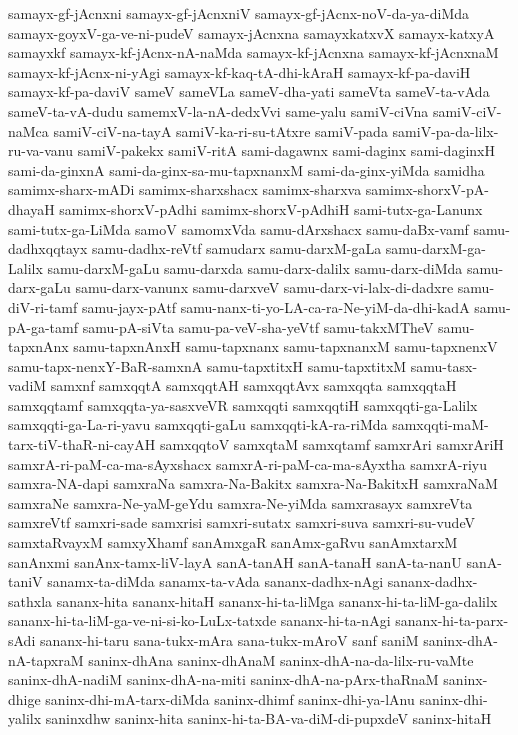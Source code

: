{samayx-gf-jAcnxni
samayx-gf-jAcnxniV
samayx-gf-jAcnx-noV-da-ya-diMda
samayx-goyxV-ga-ve-ni-pudeV
samayx-jAcnxna
samayxkatxvX
samayx-katxyA
samayxkf
samayx-kf-jAcnx-nA-naMda
samayx-kf-jAcnxna
samayx-kf-jAcnxnaM
samayx-kf-jAcnx-ni-yAgi
samayx-kf-kaq-tA-dhi-kAraH
samayx-kf-pa-daviH
samayx-kf-pa-daviV
sameV
sameVLa
sameV-dha-yati
sameVta
sameV-ta-vAda
sameV-ta-vA-dudu
samemxV-la-nA-dedxVvi
same-yalu
samiV-ciVna
samiV-ciV-naMca
samiV-ciV-na-tayA
samiV-ka-ri-su-tAtxre
samiV-pada
samiV-pa-da-lilx-ru-va-vanu
samiV-pakekx
samiV-ritA
sami-dagawnx
sami-daginx
sami-daginxH
sami-da-ginxnA
sami-da-ginx-sa-mu-tapxnanxM
sami-da-ginx-yiMda
samidha
samimx-sharx-mADi
samimx-sharxshacx
samimx-sharxva
samimx-shorxV-pA-dhayaH
samimx-shorxV-pAdhi
samimx-shorxV-pAdhiH
sami-tutx-ga-Lanunx
sami-tutx-ga-LiMda
samoV
samomxVda
samu-dArxshacx
samu-daBx-vamf
samu-dadhxqqtayx
samu-dadhx-reVtf
samudarx
samu-darxM-gaLa
samu-darxM-ga-Lalilx
samu-darxM-gaLu
samu-darxda
samu-darx-dalilx
samu-darx-diMda
samu-darx-gaLu
samu-darx-vanunx
samu-darxveV
samu-darx-vi-lalx-di-dadxre
samu-diV-ri-tamf
samu-jayx-pAtf
samu-nanx-ti-yo-LA-ca-ra-Ne-yiM-da-dhi-kadA
samu-pA-ga-tamf
samu-pA-siVta
samu-pa-veV-sha-yeVtf
samu-takxMTheV
samu-tapxnAnx
samu-tapxnAnxH
samu-tapxnanx
samu-tapxnanxM
samu-tapxnenxV
samu-tapx-nenxY-BaR-samxnA
samu-tapxtitxH
samu-tapxtitxM
samu-tasx-vadiM
samxnf
samxqqtA
samxqqtAH
samxqqtAvx
samxqqta
samxqqtaH
samxqqtamf
samxqqta-ya-sasxveVR
samxqqti
samxqqtiH
samxqqti-ga-Lalilx
samxqqti-ga-La-ri-yavu
samxqqti-gaLu
samxqqti-kA-ra-riMda
samxqqti-maM-tarx-tiV-thaR-ni-cayAH
samxqqtoV
samxqtaM
samxqtamf
samxrAri
samxrAriH
samxrA-ri-paM-ca-ma-sAyxshacx
samxrA-ri-paM-ca-ma-sAyxtha
samxrA-riyu
samxra-NA-dapi
samxraNa
samxra-Na-Bakitx
samxra-Na-BakitxH
samxraNaM
samxraNe
samxra-Ne-yaM-geYdu
samxra-Ne-yiMda
samxrasayx
samxreVta
samxreVtf
samxri-sade
samxrisi
samxri-sutatx
samxri-suva
samxri-su-vudeV
samxtaRvayxM
samxyXhamf
sanAmxgaR
sanAmx-gaRvu
sanAmxtarxM
sanAnxmi
sanAnx-tamx-liV-layA
sanA-tanAH
sanA-tanaH
sanA-ta-nanU
sanA-taniV
sanamx-ta-diMda
sanamx-ta-vAda
sananx-dadhx-nAgi
sananx-dadhx-sathxla
sananx-hita
sananx-hitaH
sananx-hi-ta-liMga
sananx-hi-ta-liM-ga-dalilx
sananx-hi-ta-liM-ga-ve-ni-si-ko-LuLx-tatxde
sananx-hi-ta-nAgi
sananx-hi-ta-parx-sAdi
sananx-hi-taru
sana-tukx-mAra
sana-tukx-mAroV
sanf
saniM
saninx-dhA-nA-tapxraM
saninx-dhAna
saninx-dhAnaM
saninx-dhA-na-da-lilx-ru-vaMte
saninx-dhA-nadiM
saninx-dhA-na-miti
saninx-dhA-na-pArx-thaRnaM
saninx-dhige
saninx-dhi-mA-tarx-diMda
saninx-dhimf
saninx-dhi-ya-lAnu
saninx-dhi-yalilx
saninxdhw
saninx-hita
saninx-hi-ta-BA-va-diM-di-pupxdeV
saninx-hitaH
}
